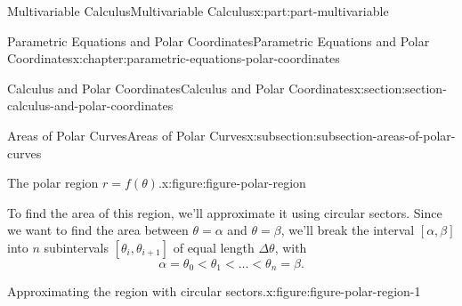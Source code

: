 \documentclass[twoside,10pt,]{tufte-book}
\numberwithin{equation}{part}
\begin{document}
\begin{partptx}{Multivariable Calculus}{}{Multivariable Calculus}{}{}{x:part:part-multivariable}
\begin{chapterptx}{Parametric Equations and Polar Coordinates}{}{Parametric Equations and Polar Coordinates}{}{}{x:chapter:parametric-equations-polar-coordinates}
\begin{sectionptx}{Calculus and Polar Coordinates}{}{Calculus and Polar Coordinates}{}{}{x:section:section-calculus-and-polar-coordinates}
\begin{subsectionptx}{Areas of Polar Curves}{}{Areas of Polar Curves}{}{}{x:subsection:subsection-areas-of-polar-curves}
\begin{figureptx}{The polar region \(r = f(\theta)\).}{x:figure:figure-polar-region}{}
\begin{image}{0}{1}{0}
{
}%
\end{image}%
\tcblower
\end{figureptx}%
To find the area of this region, we'll approximate it using circular sectors. Since we want to find the area between \(\theta=\alpha\) and \(\theta=\beta\), we'll break the interval \([\alpha,\beta]\) into \(n\) subintervals \([\theta_{i},\theta_{i+1}]\) of equal length \(\Delta\theta\), with%
%
\begin{equation*}
\alpha = \theta_{0} < \theta_{1} < \dots < \theta_{n} = \beta.
\end{equation*}
\begin{figureptx}{Approximating the region with circular sectors.}{x:figure:figure-polar-region-1}{}%
\begin{image}{0}{1}{0}%
\end{image}
\end{figureptx}
\end{subsectionptx}
\end{sectionptx}
\end{chapterptx}
\end{partptx}
\end{document}
